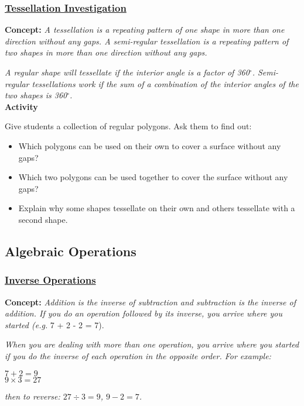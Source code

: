 		\subsubsection{\underline{Tessellation Investigation}}
		\textbf{Concept:} \emph{A tessellation is a repeating pattern of one shape in more than one direction without any gaps. A semi-regular tessellation is a repeating pattern of two shapes in more than one direction without any gaps.}
		
		\emph{A regular shape will tessellate if the interior angle is a factor of 360$^\circ$. Semi-regular tessellations work if the sum of a combination of the interior angles of the two shapes is 360$^\circ$.}\\
		
		\noindent \textbf{Activity}
		
		\noindent Give students a collection of regular polygons. Ask them to find out:
		\begin{itemize}
	\item Which polygons can be used on their own to cover a surface without any gaps?
	\item Which two polygons can be used together to cover the surface without any gaps?
	\item Explain why some shapes tessellate on their own and others tessellate with a second shape.
		\end{itemize}
	
	\subsection{Algebraic Operations} \label{classactsalgebra}
	
		\subsubsection{\underline{Inverse Operations}}
		\textbf{Concept:} \emph{Addition is the inverse of subtraction and subtraction is the inverse of addition. If you do an operation followed by its inverse, you arrive where you started (e.g.} 7 + 2 - 2 = 7).
		
		\emph{When you are dealing with more than one operation, you arrive where you started if you do the inverse of each operation in the opposite order. For example:}
		\begin{center}
		$7 + 2 = 9$\\
		$9 \times 3 = 27$
		\end{center}
		\emph{then to reverse: $27 \div 3 = 9$, $9 - 2 = 7$.}\\
		
